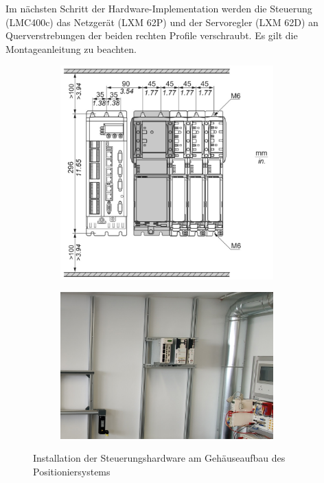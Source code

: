 \documentclass[../../../Bachelorarbeit.tex]{subfiles}
\begin{document}
Im nächsten Schritt der Hardware-Implementation werden die Steuerung (LMC400c) das Netzgerät (LXM 62P) und der Servoregler (LXM 62D) an Querverstrebungen der beiden rechten Profile verschraubt. Es gilt die Montageanleitung zu beachten.

\begin{figure}[H]
    \centering
    \begin{subfigure}[c]{0.42\textwidth}
        \centering
        \includegraphics[width=0.9\textwidth]{Images/Steuerungshardwareinstallation.jpg}
    \end{subfigure}
    \begin{subfigure}[c]{0.42\textwidth}
        \centering
        \includegraphics[width=0.9\textwidth]{Images/Steuerungshardware.jpg}
    \end{subfigure}
    \caption[Steuerungsinstallation]{Installation der Steuerungshardware am Gehäuseaufbau des Positioniersystems}
    \label{fig:my-img21}
\end{figure}
\end{document}
